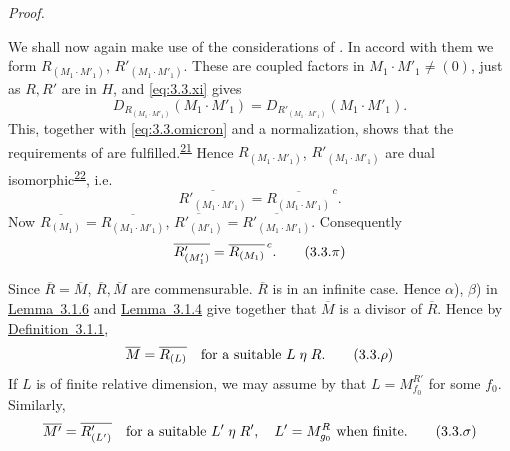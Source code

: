 \documentclass[b5paper,twoside]{article}
\newcommand{\lemref}[2]{\hyperref[#1]{\mbox{Lemma~#2}}}
\newcommand{\defref}[2]{\hyperref[#1]{\mbox{Definition~#2}}}
\theoremstyle{mvnplain}
\renewenvironment{proof}[1][Proof]{%
  \par\addvspace{0.35\baselineskip}%
  \noindent\textit{#1.}\ \normalfont\ignorespaces
}{%
  \par\addvspace{0.35\baselineskip}%
}
\newcommand{\M}{\mathbf M}
\newcommand{\R}{\mathbf R}
\newcommand{\Hilbert}{\mathfrak H}
\def\M{M}%
\def\R{R}%
\def\Hilbert{H}%
\def\widetilde#1{#1}%
\def\mathfrak#1{#1}%
\begin{document}
\begin{proof}
We shall now again make use of the considerations of
\cite[pp.~188--190, \S11.4]{ref5}. In accord with them we form
\(\R_{(\mathfrak M_1\cdot\mathfrak M'_1)}\),
\(\R'_{(\mathfrak M_1\cdot\mathfrak M'_1)}\). These are coupled factors in
\(\mathfrak M_1\cdot\mathfrak M'_1\ne(0)\), just as \(\R,\R'\) are in
\(\Hilbert\), and \eqref{eq:3.3.xi} gives
\[
  D_{\R_{(\mathfrak M_1\cdot\mathfrak M'_1)}}
    (\mathfrak M_1\cdot\mathfrak M'_1)
  =D_{\R'_{(\mathfrak M_1\cdot\mathfrak M'_1)}}
    (\mathfrak M_1\cdot\mathfrak M'_1).
\]
This, together with \eqref{eq:3.3.omicron} and a normalization, shows that the
requirements of \cite[p.~239, Theorem~VI]{ref6} are fulfilled.\textsuperscript{\hyperlink{fn:21}{21}} Hence
\(\R_{(\mathfrak M_1\cdot\mathfrak M'_1)}\),
\(\R'_{(\mathfrak M_1\cdot\mathfrak M'_1)}\) are dual
isomorphic\textsuperscript{\hyperlink{fn:22}{22}}, i.e.
\[
  \overline{\R'_{(\mathfrak M_1\cdot\mathfrak M'_1)}}
  =\overline{\R_{(\mathfrak M_1\cdot\mathfrak M'_1)}}^{\,c}.
\]
Now
\(\overline{\R_{(\mathfrak M_1)}}
=\overline{\R_{(\mathfrak M_1\cdot\mathfrak M'_1)}}\),
\(\overline{\R'_{(\mathfrak M'_1)}}
=\overline{\R'_{(\mathfrak M_1\cdot\mathfrak M'_1)}}\). Consequently
\begin{equation}
  \overline{\R'_{(\mathfrak M'_1)}}
  =\overline{\R_{(\mathfrak M_1)}}^{\,c}.
  \tag{3.3.\ensuremath{\pi}}\label{eq:3.3.pi}
\end{equation}

Since \(\widetilde{\overline{\R}}=\widetilde{\overline{\M}}\),
\(\overline{\R},\overline{\M}\) are commensurable. \(\overline{\R}\) is
in an infinite case. Hence \(\alpha\)), \(\beta\)) in
\lemref{lem:3.1.6}{3.1.6} and \lemref{lem:3.1.4}{3.1.4} give together that
\(\overline{\M}\) is a divisor of \(\overline{\R}\). Hence by
\defref{def:3.1.1}{3.1.1},
\begin{equation}
  \overline{\M}=\overline{\R_{(\mathfrak L)}}
 \quad\text{for a suitable }\mathfrak L\mathrel{\eta}\R.
  \tag{3.3.\ensuremath{\rho}}\label{eq:3.3.rho}
\end{equation}
If \(\mathfrak L\) is of finite relative dimension, we may assume by
\cite[Theorem~X]{ref5} that \(\mathfrak L=\mathfrak M_{f_0}^{\R'}\) for some
\(f_0\). Similarly,
\begin{equation}
  \overline{\M'}=\overline{\R'_{(\mathfrak L')}}
 \quad\text{for a suitable }\mathfrak L'\mathrel{\eta}\R',\quad
  \mathfrak L'=\mathfrak M_{g_0}^{\R}\text{ when finite}.
  \tag{3.3.\ensuremath{\sigma}}\label{eq:3.3.sigma}
\end{equation}


\end{proof}
\end{document}

